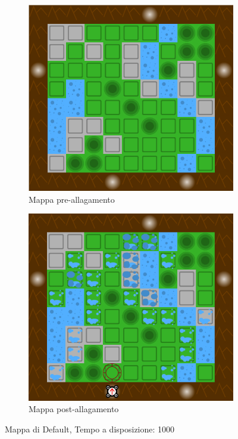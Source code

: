 \begin{figure}
        \centering
        \begin{subfigure}[b]{0.5\textwidth}
                \includegraphics[width=\textwidth]{maps/default.png}
                \caption{Mappa pre-allagamento}
                \label{fig:default-pre}
        \end{subfigure}%

        \begin{subfigure}[b]{0.5\textwidth}
                \includegraphics[width=\textwidth]{maps/default-flood.png}
                \caption{Mappa post-allagamento}
                \label{fig:default-post}
        \end{subfigure}
       
        \caption{Mappa di Default, Tempo a disposizione: 1000}\label{fig:default-all}
\end{figure}

